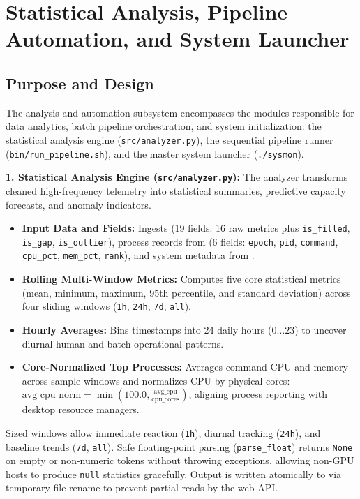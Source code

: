 \section{Statistical Analysis, Pipeline Automation, and System Launcher}

\subsection{Purpose and Design}
The analysis and automation subsystem encompasses the modules responsible for data analytics, batch pipeline orchestration, and system initialization: the statistical analysis engine (\texttt{src/analyzer.py}), the sequential pipeline runner (\texttt{bin/run\_pipeline.sh}), and the master system launcher (\texttt{./sysmon}).

\textbf{1. Statistical Analysis Engine (\texttt{src/analyzer.py}):}
The analyzer transforms cleaned high-frequency telemetry into statistical summaries, predictive capacity forecasts, and anomaly indicators. 
\begin{itemize}
    \item \textbf{Input Data and Fields:} Ingests  (19 fields: 16 raw metrics plus \texttt{is\_filled}, \texttt{is\_gap}, \texttt{is\_outlier}), process records from  (6 fields: \texttt{epoch}, \texttt{pid}, \texttt{command}, \texttt{cpu\_pct}, \texttt{mem\_pct}, \texttt{rank}), and system metadata from .
    \item \textbf{Rolling Multi-Window Metrics:} Computes five core statistical metrics (mean, minimum, maximum, 95th percentile, and standard deviation) across four sliding windows (\texttt{1h}, \texttt{24h}, \texttt{7d}, \texttt{all}).
    \item \textbf{Hourly Averages:} Bins timestamps into 24 daily hours ($0\dots 23$) to uncover diurnal human and batch operational patterns. 
    \item \textbf{Core-Normalized Top Processes:} Averages command CPU and memory across sample windows and normalizes CPU by physical cores: $\text{avg\_cpu\_norm} = \min\left(100.0, \frac{\text{avg\_cpu}}{\text{cpu\_cores}}\right)$, aligning process reporting with desktop resource managers. 
\end{itemize}
Sized windows allow immediate reaction (\texttt{1h}), diurnal tracking (\texttt{24h}), and baseline trends (\texttt{7d}, \texttt{all}). Safe floating-point parsing (\texttt{parse\_float}) returns \texttt{None} on empty or non-numeric tokens without throwing exceptions, allowing non-GPU hosts to produce \texttt{null} statistics gracefully. Output is written atomically to  via temporary file rename to prevent partial reads by the web API.

